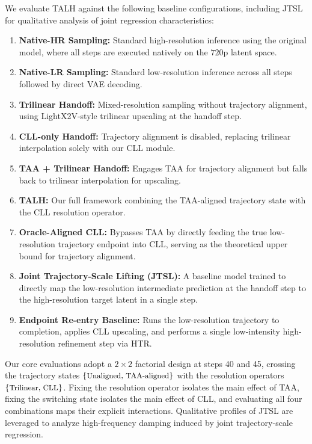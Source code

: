 We evaluate TALH against the following baseline configurations, including JTSL for qualitative analysis of joint regression characteristics:

\begin{enumerate}
\def\labelenumi{\arabic{enumi}.}
\tightlist
\item
  \textbf{Native-HR Sampling:} Standard high-resolution inference using the original model, where all steps are executed natively on the \(720\text{p}\) latent space.
\item
  \textbf{Native-LR Sampling:} Standard low-resolution inference across all steps followed by direct VAE decoding.
\item
  \textbf{Trilinear Handoff:} Mixed-resolution sampling without trajectory alignment, using LightX2V-style trilinear upscaling at the handoff step.
\item
  \textbf{CLL-only Handoff:} Trajectory alignment is disabled, replacing trilinear interpolation solely with our CLL module.
\item
  \textbf{TAA + Trilinear Handoff:} Engages TAA for trajectory alignment but falls back to trilinear interpolation for upscaling.
\item
  \textbf{TALH:} Our full framework combining the TAA-aligned trajectory state with the CLL resolution operator.
\item
  \textbf{Oracle-Aligned CLL:} Bypasses TAA by directly feeding the true low-resolution trajectory endpoint into CLL, serving as the theoretical upper bound for trajectory alignment.
\item
  \textbf{Joint Trajectory-Scale Lifting (JTSL):} A baseline model trained to directly map the low-resolution intermediate prediction at the handoff step to the high-resolution target latent in a single step.
\item
  \textbf{Endpoint Re-entry Baseline:} Runs the low-resolution trajectory to completion, applies CLL upscaling, and performs a single low-intensity high-resolution refinement step via HTR.
\end{enumerate}

Our core evaluations adopt a \(2\times2\) factorial design at steps 40 and 45, crossing the trajectory states \(\small\{\text{Unaligned, TAA-aligned}\small\}\) with the resolution operators \(\small\{\text{Trilinear, CLL}\small\}\). Fixing the resolution operator isolates the main effect of TAA, fixing the switching state isolates the main effect of CLL, and evaluating all four combinations maps their explicit interactions. Qualitative profiles of JTSL are leveraged to analyze high-frequency damping induced by joint trajectory-scale regression.

